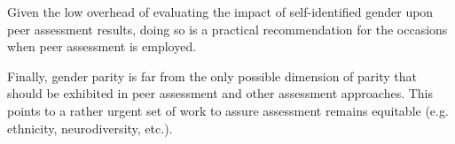 \documentclass[sigconf, anonymous=true]{acmart}
\begin{document}
Given the low overhead of evaluating the impact of self-identified gender upon peer assessment results, doing so is a practical recommendation for the occasions when peer assessment is employed.

Finally, gender parity is far from the only possible dimension of parity that should be exhibited in peer assessment and other assessment approaches. This points to a rather urgent set of work to assure assessment remains equitable (e.g. ethnicity, neurodiversity, etc.). 


\end{document}
